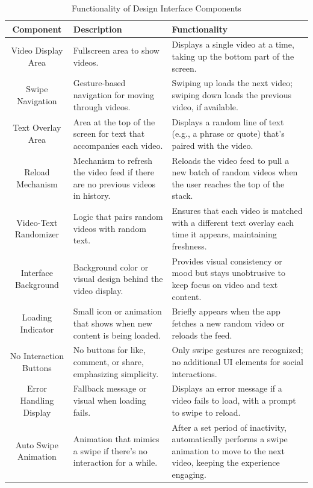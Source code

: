 \documentclass{article}
\begin{document}
\begin{table}[H]
    \begin{tabularx}{\textwidth}{|c|X|X|}
        \hline
        \textbf{Component} & \textbf{Description} & \textbf{Functionality} \\
        \hline
        Video Display Area & Fullscreen area to show videos. & Displays a single video at a time, taking up the bottom part of the screen. \\
        \hline
        Swipe Navigation & Gesture-based navigation for moving through videos. & Swiping up loads the next video; swiping down loads the previous video, if available. \\
        \hline
        Text Overlay Area & Area at the top of the screen for text that accompanies each video. & Displays a random line of text (e.g., a phrase or quote) that’s paired with the video. \\
        \hline
        Reload Mechanism & Mechanism to refresh the video feed if there are no previous videos in history. & Reloads the video feed to pull a new batch of random videos when the user reaches the top of the stack. \\
        \hline
        Video-Text Randomizer & Logic that pairs random videos with random text. & Ensures that each video is matched with a different text overlay each time it appears, maintaining freshness. \\
        \hline
        Interface Background & Background color or visual design behind the video display. & Provides visual consistency or mood but stays unobtrusive to keep focus on video and text content. \\
        \hline
        Loading Indicator & Small icon or animation that shows when new content is being loaded. & Briefly appears when the app fetches a new random video or reloads the feed. \\
        \hline
        No Interaction Buttons & No buttons for like, comment, or share, emphasizing simplicity. & Only swipe gestures are recognized; no additional UI elements for social interactions. \\
        \hline
        Error Handling Display & Fallback message or visual when loading fails. & Displays an error message if a video fails to load, with a prompt to swipe to reload. \\
        \hline
        Auto Swipe Animation & Animation that mimics a swipe if there’s no interaction for a while. & After a set period of inactivity, automatically performs a swipe animation to move to the next video, keeping the experience engaging. \\
        \hline
    \end{tabularx}
    \caption{Functionality of Design Interface Components}
\end{table}
\end{document}
